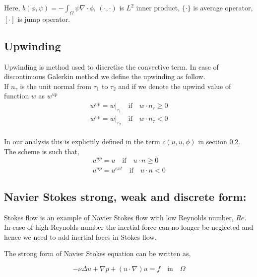 \documentclass[a4paper,12pt]{book}
\begin{document}
Here, $b(\phi,\psi) = -\int_{\Omega} \psi \nabla \cdot \phi$, $(\cdot , \cdot)$ is $L^2$ inner product, $\{\cdot\}$ is average operator, $[\cdot]$ is jump operator. 

\subsection{Upwinding} \label{upwinding}

Upwinding is method used to discretise the convective term. In case of discontinuous Galerkin method we define the upwinding as follow.\\

If $n_\tau$ is the unit normal from $\tau_1$ to $\tau_2$ and if we denote the upwind value of function $w$ as $w^{up}$ \cite{riviere}
\begin{equation}
\begin{split}
w^{up} = w|_{\tau_1} \quad \textrm{if} \quad w \cdot n_\tau \geq 0 \\
w^{up} = w|_{\tau_2} \quad \textrm{if} \quad w \cdot n_\tau < 0
\end{split}
\end{equation}
\\
In our analysis this is explicitly defined in the term $c(u,u,\phi)$ in section \ref{n_s_ch3}. The scheme is such that,
\begin{equation}
\begin{split}
u^{up} = u \quad \textrm{if} \quad u \cdot n \geq 0 \\
u^{up} = u^{ext} \quad \textrm{if} \quad u \cdot n < 0
\end{split}
\end{equation}

\subsection{Navier Stokes strong, weak and discrete form:} \label{n_s_ch3}

Stokes flow is an example of Navier Stokes flow with low Reynolds number, $Re$. In case of high Reynolds number the inertial force can no longer be neglected and hence we need to add inertial foces in Stokes flow. 

The strong form of Navier Stokes equation can be written as,

\begin{equation} \label{navier_stokes_strong_ch3}
-\nu \Delta u + \nabla p + (u \cdot \nabla) u = f \quad \textrm{in} \quad \Omega
\end{equation}
\end{document}
